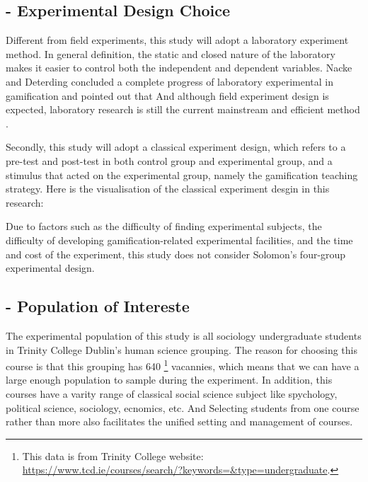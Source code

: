 \documentclass[12pt]{article} %
\begin{document}
\vspace{.5cm}

\subsection*{- Experimental Design Choice}

\vspace{.3cm}

\noindent Different from field experiments, this study will adopt a laboratory experiment method. In general definition, the static and closed nature of the laboratory makes it easier to control both the independent and dependent variables. Nacke and Deterding concluded a complete progress of laboratory experimental in gamification and pointed out that And although field experiment design is expected, laboratory research is still the current mainstream and efficient method \citep{nacke2017maturing}.

\noindent Secondly, this study will adopt a classical experiment design, which refers to a pre-test and post-test in both control group and experimental group, and a stimulus that acted on the experimental group, namely the gamification teaching strategy. Here is the visualisation of the classical experiment desgin in this research:


\noindent Due to factors such as the difficulty of finding experimental subjects, the difficulty of developing gamification-related experimental facilities, and the time and cost of the experiment, this study does not consider Solomon's four-group experimental design.

\subsection*{- Population of Intereste}

\vspace{.3cm}

\noindent The experimental population of this study is all sociology undergraduate students in Trinity College Dublin's human science grouping. The reason for choosing this course is that this grouping has 640
\footnote[4]{
	This data is from Trinity College website:
	\url{https://www.tcd.ie/courses/search/?keywords=&type=undergraduate}.
}
vacannies, which means that we can have a large enough population to sample during the experiment. In addition, this courses have a varity range of classical social science subject like spychology, political science, sociology, ecnomics, etc. And Selecting students from one course rather than more also facilitates the unified setting and management of courses.
\end{document}
